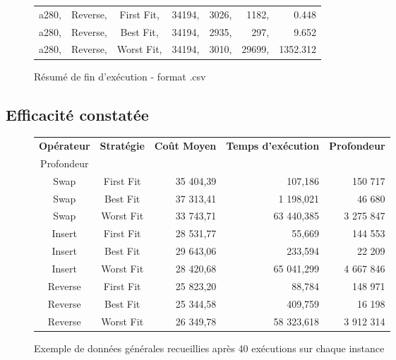 \documentclass[a4paper,10pt]{report}
\begin{document}
\begin{figure}[h]
  \begin{center}
    \begin{tabular}{cccrrrr}
      a280, &Reverse, &First Fit, &34194, &3026, &1182, &0.448\\
      a280, &Reverse, &Best Fit,  &34194, &2935, &297,  &9.652\\
      a280, &Reverse, &Worst Fit, &34194, &3010, &29699,&1352.312\\
    \end{tabular}
  \end{center}
  \label{a280-sample-csv}
  \caption{Résumé de fin d'exécution - format .csv}
\end{figure}


\subsection{Efficacité constatée}

\begin{figure}[h]
  \begin{center}
    \begin{tabular}{ccrrr}
      \textbf{Opérateur}& \textbf{Stratégie}& \textbf{Coût Moyen}& \textbf{Temps
d'exécution}& \textbf{Profondeur}\\
Profondeur\\
      Swap&	First Fit&	35 404,39&	107,186&	150 717\\
      Swap&	Best Fit&	37 313,41&	1 198,021&	46 680\\
      Swap&	Worst Fit&	33 743,71&	63 440,385&	3 275 847\\
      Insert&	First Fit&	28 531,77&	55,669&		144 553\\
      Insert&	Best Fit&	29 643,06&	233,594&	22 209\\
      Insert&	Worst Fit&	28 420,68&	65 041,299&	4 667 846\\
      Reverse&	First Fit&	25 823,20&	88,784&		148 971\\
      Reverse&	Best Fit&	25 344,58&	409,759&	16 198\\
      Reverse&	Worst Fit&	26 349,78&	58 323,618&	3 912 314\\
    \end{tabular}
  \end{center}
  \label{recap-general}
  \caption{Exemple de données générales recueillies après 40 exécutions sur
chaque instance}
\end{figure}
\end{document}
